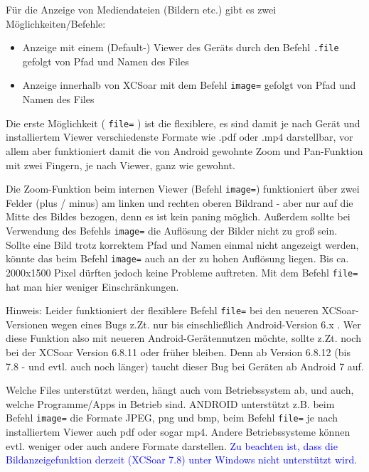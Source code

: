 Für die Anzeige von Mediendateien (Bildern etc.) gibt es zwei Möglichkeiten/Befehle:

\begin{itemize}
\item Anzeige mit einem (Default-) Viewer des Geräts durch den Befehl \verb|.file| gefolgt von Pfad und Namen des Files
\item Anzeige innerhalb von XCSoar mit dem Befehl \verb|image=| gefolgt von Pfad und Namen des Files
\end{itemize}



Die erste Möglichkeit ( \verb|file=| ) ist die flexiblere, es sind damit je nach Gerät und installiertem Viewer verschiedenste Formate wie .pdf oder .mp4 darstellbar, vor allem aber funktioniert damit die von Android gewohnte Zoom und Pan-Funktion mit zwei Fingern, je nach Viewer, ganz wie gewohnt. 

Die Zoom-Funktion beim internen Viewer (Befehl \verb|image=|) funktioniert über zwei Felder (plus / minus) am linken und rechten oberen Bildrand - aber nur auf die Mitte des Bildes bezogen, denn es ist kein paning möglich. Außerdem sollte bei Verwendung des Befehls \verb|image=| die Auflösung der Bilder nicht zu groß sein. 
Sollte eine Bild trotz korrektem Pfad und Namen einmal nicht angezeigt werden, könnte das beim Befehl \verb|image=| auch an der zu hohen Auflösung liegen. Bis ca. 2000x1500 Pixel dürften jedoch keine Probleme auftreten. Mit dem Befehl \verb|file=| hat man hier weniger Einschränkungen. 

%
Hinweis: 
Leider funktioniert der flexiblere Befehl \verb|file=| bei den neueren XCSoar-Versionen wegen eines Bugs z.Zt. nur bis einschließlich Android-Version 6.x . Wer diese Funktion also mit neueren Android-Gerätennutzen möchte, sollte z.Zt. noch bei der XCSoar Version 6.8.11 oder früher bleiben. Denn ab Version 6.8.12 (bis 7.8 - und evtl. auch noch länger) taucht dieser Bug bei Geräten ab Android 7 auf.
% 
% 

Welche Files unterstützt werden, hängt auch vom Betriebssystem ab, und auch, welche Programme/Apps
in Betrieb sind. ANDROID unterstützt z.B. beim Befehl \verb|image=| die Formate JPEG, png und bmp, beim Befehl \verb|file=| je nach installiertem Viewer auch pdf oder sogar mp4.
Andere Betriebssysteme können evtl. weniger oder auch andere Formate darstellen.
\textcolor{blue}{Zu beachten ist, dass die Bildanzeigefunktion derzeit (XCSoar 7.8) unter Windows nicht unterstützt wird.} 

